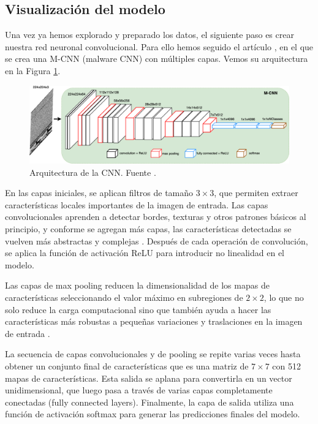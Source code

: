 \subsection{Visualización del modelo}


Una vez ya hemos explorado y preparado los datos, el siguiente paso es crear nuestra red neuronal convolucional. Para ello hemos seguido el artículo \citep{kalash2018malware}, en el que se crea una M-CNN (malware CNN) con múltiples capas. Vemos su arquitectura en la Figura \ref{img: cnnMMC}.

\begin{figure}[h]
    \begin{center}
    \includegraphics[width=\textwidth]{img/cnnMMC.png}
    \end{center}
    \caption{Arquitectura de la CNN. Fuente \citep{kalash2018malware}.}
    \label{img: cnnMMC}
\end{figure}

En las capas iniciales, se aplican filtros de tamaño $3 \times 3$, que permiten extraer características locales importantes de la imagen de entrada. Las capas convolucionales aprenden a detectar bordes, texturas y otros patrones básicos al principio, y conforme se agregan más capas, las características detectadas se vuelven más abstractas y complejas \citep{geron2022hands}. Después de cada operación de convolución, se aplica la función de activación ReLU para introducir no linealidad en el modelo.

Las capas de max pooling reducen la dimensionalidad de los mapas de características seleccionando el valor máximo en subregiones de $2 \times 2$, lo que no solo reduce la carga computacional sino que también ayuda a hacer las características más robustas a pequeñas variaciones y traslaciones en la imagen de entrada \citep{geron2022hands}.

La secuencia de capas convolucionales y de pooling se repite varias veces hasta obtener un conjunto final de características que es una matriz de $7 \times 7$ con 512 mapas de características. Esta salida se aplana para convertirla en un vector unidimensional, que luego pasa a través de varias capas completamente conectadas (fully connected layers). Finalmente, la capa de salida utiliza una función de activación softmax para generar las predicciones finales del modelo.

